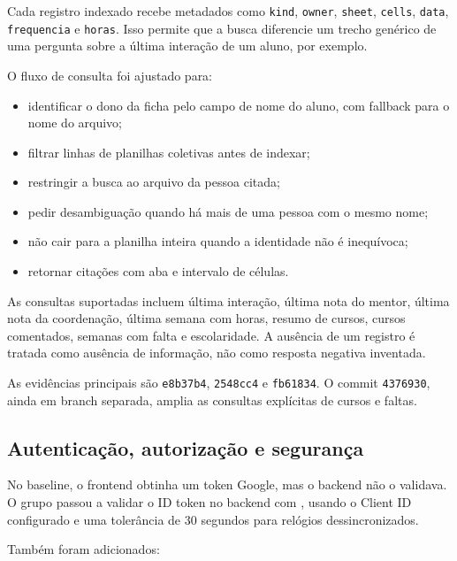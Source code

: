 \documentclass[12pt,a4paper]{article}
\newcommand{\commit}[1]{\texttt{#1}}
\begin{document}
Cada registro indexado recebe metadados como \texttt{kind}, \texttt{owner},
\texttt{sheet}, \texttt{cells}, \texttt{data}, \texttt{frequencia} e
\texttt{horas}. Isso permite que a busca diferencie um trecho genérico de uma
pergunta sobre a última interação de um aluno, por exemplo.

O fluxo de consulta foi ajustado para:

\begin{itemize}
  \item identificar o dono da ficha pelo campo de nome do aluno, com fallback para
        o nome do arquivo;
  \item filtrar linhas de planilhas coletivas antes de indexar;
  \item restringir a busca ao arquivo da pessoa citada;
  \item pedir desambiguação quando há mais de uma pessoa com o mesmo nome;
  \item não cair para a planilha inteira quando a identidade não é inequívoca;
  \item retornar citações com aba e intervalo de células.
\end{itemize}

As consultas suportadas incluem última interação, última nota do mentor, última
nota da coordenação, última semana com horas, resumo de cursos, cursos comentados,
semanas com falta e escolaridade. A ausência de um registro é tratada como
ausência de informação, não como resposta negativa inventada.

As evidências principais são \commit{e8b37b4}, \commit{2548cc4} e
\commit{fb61834}. O commit \commit{4376930}, ainda em branch separada, amplia as
consultas explícitas de cursos e faltas.

\subsection{Autenticação, autorização e segurança}

No baseline, o frontend obtinha um token Google, mas o backend não o validava. O
grupo passou a validar o ID token no backend com
, usando o Client ID
configurado e uma tolerância de 30 segundos para relógios dessincronizados.

Também foram adicionados:
\end{document}
